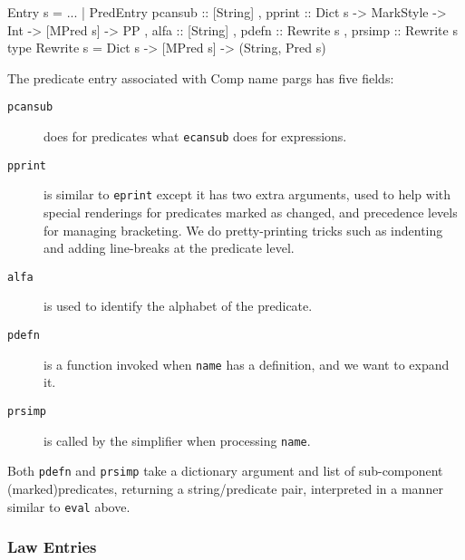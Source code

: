 \begin{code}
Entry s
  = ...
  | PredEntry
    { pcansub :: [String]
    , pprint :: Dict s -> MarkStyle -> Int -> [MPred s] -> PP
    , alfa :: [String]
    , pdefn :: Rewrite s
    , prsimp :: Rewrite s }
type Rewrite s = Dict s -> [MPred s] -> (String, Pred s)
\end{code}
The predicate entry associated with Comp name pargs
has five fields:
\begin{description}
  \item[\texttt{pcansub}]
    does for predicates what \texttt{ecansub} does for expressions.
  \item[\texttt{pprint}]
    is similar to \texttt{eprint} except it has two extra arguments,
    used to help with special renderings for predicates marked as changed,
    and precedence levels for managing bracketing.
    We do pretty-printing tricks such as indenting and adding line-breaks
    at the predicate level.
  \item[\texttt{alfa}]
    is used to identify the alphabet of the predicate.
  \item[\texttt{pdefn}]
    is a function invoked when \texttt{name} has a definition,
    and we want to expand it.
  \item[\texttt{prsimp}]
    is called by the simplifier when processing \texttt{name}.
\end{description}
Both \texttt{pdefn} and \texttt{prsimp} take a dictionary argument
and list of sub-component (marked)predicates,
returning a string/predicate pair,
interpreted in a manner similar to \texttt{eval} above.

\subsubsection{Law Entries}~

